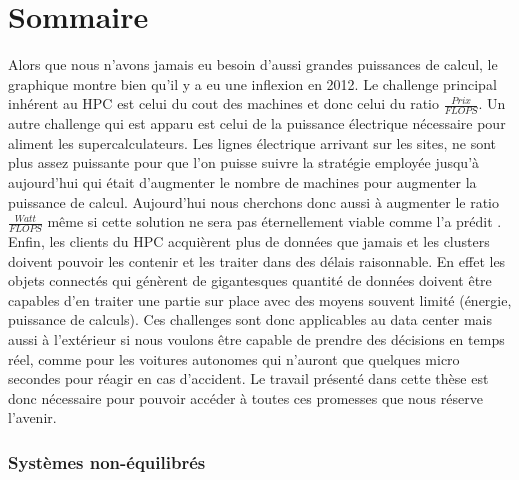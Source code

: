 \section{Sommaire}

Alors que nous n'avons jamais eu besoin d'aussi grandes puissances de calcul, le graphique montre bien qu'il y a eu une inflexion en 2012. Le challenge principal inhérent au HPC est celui du cout des machines et donc celui du ratio $\frac{Prix}{FLOPS}$. Un autre challenge qui est apparu est celui de la puissance électrique nécessaire pour aliment les supercalculateurs. Les lignes électrique arrivant sur les sites, ne sont plus assez puissante pour que l'on puisse suivre la stratégie employée jusqu'à aujourd'hui qui était d'augmenter le nombre de machines pour augmenter la puissance de calcul. Aujourd'hui nous cherchons donc aussi à augmenter le ratio $\frac{Watt}{FLOPS}$ même si cette solution ne sera pas éternellement viable comme l'a prédit \cite{5392446}.
Enfin, les clients du HPC acquièrent plus de données que jamais et les clusters doivent pouvoir les contenir et les traiter dans des délais raisonnable. En effet les objets connectés qui génèrent de gigantesques quantité de données doivent être capables d'en traiter une partie sur place avec des moyens souvent limité (énergie, puissance de calculs). Ces challenges sont donc applicables au data center mais aussi à l'extérieur si nous voulons être capable de prendre des décisions en temps réel, comme pour les voitures autonomes qui n'auront que quelques micro secondes pour réagir en cas d'accident. Le travail présenté dans cette thèse est donc nécessaire pour pouvoir accéder à toutes ces promesses que nous réserve l'avenir.


\subsubsection{Systèmes non-équilibrés}

